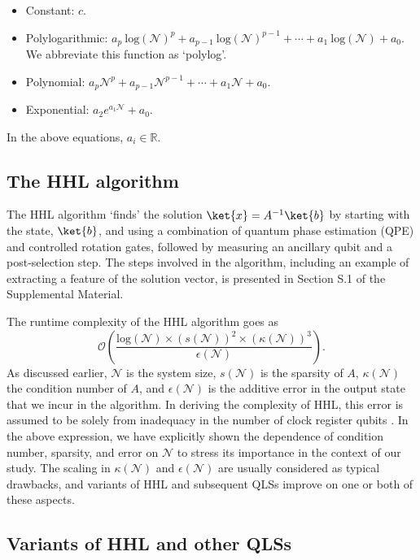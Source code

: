 \documentclass[%
 reprint,
 superscriptaddress,
 amsmath,amssymb,
 aps,
 pra,
floatfix,
nofootinbib,
]{revtex4-2}
\theoremstyle{definition}
\theoremstyle{remark}
\begin{document}
\begin{itemize}
\item Constant: $c$. 
\item Polylogarithmic: $a_p\ \mathrm{log}(\mathcal{N})^p + a_{p-1}\ \mathrm{log}(\mathcal{N})^{p-1} + \cdots +a_1\ \mathrm{log}(\mathcal{N}) + a_0$. We abbreviate this function as `polylog'. 
\item Polynomial: $a_p\mathcal{N}^p + a_{p-1}\mathcal{N}^{p-1} + \cdots +a_1\mathcal{N} + a_0$. 
\item Exponential: $a_2e^{a_1\mathcal{N}}+a_0$. 
\end{itemize} 

In the above equations, $a_i \in \mathbb{R}$. 

\subsection{The HHL algorithm} \label{sec:hhl} 

The HHL algorithm `finds' the solution $\ket{x} = A^{-1}\ket{b}$ by starting with the state, $\ket{b}$, and using a combination of quantum phase estimation (QPE) and controlled rotation gates, followed by measuring an ancillary qubit and a post-selection step. The steps involved in the algorithm, including an example of extracting a feature of the solution vector, is presented in Section S.1 of the Supplemental Material. 

The runtime complexity of the HHL algorithm goes as 
$$\mathcal{O}\left(\frac{\mathrm{log}(\mathcal{N}) \times (s(\mathcal{N}))^2 \times (\kappa(\mathcal{N}))^3}{\epsilon(\mathcal{N})}\right).$$ As discussed earlier, $\mathcal{N}$ is the system size, $s(\mathcal{N})$ is the sparsity of $A$, $\kappa(\mathcal{N})$ the condition number of $A$, and $\epsilon(\mathcal{N})$ is the additive error in the output state that we incur in the algorithm. In deriving the complexity of HHL, this error is assumed to be solely from inadequacy in the number of clock register qubits \cite{Harrow2009QuantumEquations}. In the above expression, we have explicitly shown the dependence of condition number, sparsity, and error on $\mathcal{N}$ to stress its importance in the context of our study. The scaling in $\kappa(\mathcal{N})$ and $\epsilon(\mathcal{N})$ are usually considered as typical drawbacks, and variants of HHL and subsequent QLSs improve on one or both of these aspects. 

\subsection{Variants of HHL and other QLSs} \label{sec:hhlvar} 
\end{document}

